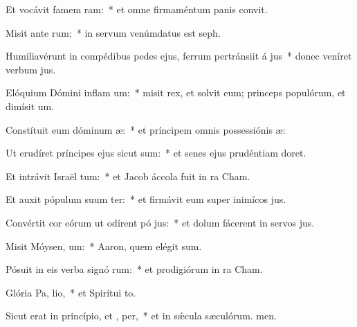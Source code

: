 \item Et vocávit famem  ram:~* et omne firmaméntum panis convit.
\item Misit ante  rum:~* in servum venúmdatus est seph.
\item Humiliavérunt in compédibus pedes ejus, ferrum pertránsiit á jus~* donec veníret verbum jus.
\item Elóquium Dómini inflam um:~* misit rex, et solvit eum; princeps populórum, et dimísit um.
\item Constítuit eum dóminum  æ:~* et príncipem omnis possessiónis æ:
\item Ut erudíret príncipes ejus sicut sum:~* et senes ejus prudéntiam doret.
\item Et intrávit Israël  tum:~* et Jacob áccola fuit in ra Cham.
\item Et auxit pópulum suum ter:~* et firmávit eum super inimícos jus.
\item Convértit cor eórum ut odírent pó jus:~* et dolum fácerent in servos jus.
\item Misit Móysen,  um:~* Aaron, quem elégit sum.
\item Pósuit in eis verba signó rum:~* et prodigiórum in ra Cham.
\item Glória Pa,  lio,~* et Spirítui to.
\item Sicut erat in princípio, et ,  per,~* et in sǽcula sæculórum. men.
